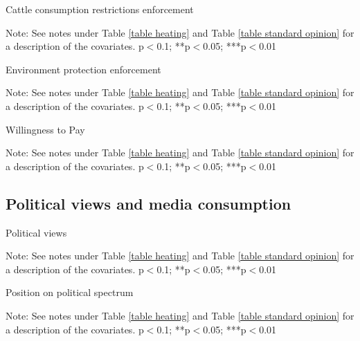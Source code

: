 \documentclass{article}
\begin{document}
\begin{table}[h!]
	\caption{Cattle consumption restrictions enforcement}
	\begin{center}
		\scalebox{0.7}{}
	\end{center}
	{\footnotesize Note: See notes under Table \ref{table heating} and Table \ref{table standard opinion} for a description of the covariates.
	\newline *p$<$0.1; **p$<$0.05; ***p$<$0.01}
\end{table}	

\begin{table}[h!]
	\caption{Environment protection enforcement}
	\begin{center}
		\scalebox{0.7}{}
	\end{center}
	{\footnotesize Note: See notes under Table \ref{table heating} and Table \ref{table standard opinion} for a description of the covariates.
	\newline *p$<$0.1; **p$<$0.05; ***p$<$0.01}
\end{table}	

\begin{table}[h!]
	\caption{Willingness to Pay}
	\begin{center}
		\scalebox{0.7}{}
	\end{center}
	{\footnotesize Note: See notes under Table \ref{table heating} and Table \ref{table standard opinion} for a description of the covariates.
	\newline *p$<$0.1; **p$<$0.05; ***p$<$0.01}
\end{table}	

\clearpage
\subsection{Political views and media consumption}

\begin{table}[h!]
	\caption{Political views}
	\begin{center}
		\scalebox{0.7}{}
	\end{center}
	{\footnotesize Note: See notes under Table \ref{table heating} and Table \ref{table standard opinion} for a description of the covariates.
	\newline *p$<$0.1; **p$<$0.05; ***p$<$0.01}
\end{table}	

\begin{landscape}
	\begin{table}[h!]
	\caption{Position on political spectrum}
	\begin{center}
		\scalebox{0.6}{}
	\end{center}
	{\footnotesize Note: See notes under Table \ref{table heating} and Table \ref{table standard opinion} for a description of the covariates.
	\newline *p$<$0.1; **p$<$0.05; ***p$<$0.01}
\end{table}	
\end{landscape}
\end{document}
